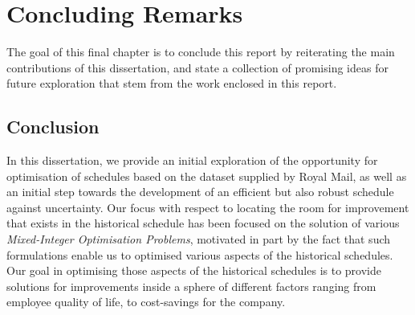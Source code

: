 \chapter{Concluding Remarks}
\label{chapter: Future Directions}

The goal of this final chapter is to conclude this report by reiterating the main contributions of this dissertation, and state a collection of promising ideas for future exploration that stem from the work enclosed in this report.

\section{Conclusion}


In this dissertation, we provide an initial exploration of the opportunity for optimisation of schedules based on the dataset supplied by Royal Mail, as well as an initial step towards the development of an efficient but also robust schedule against uncertainty. Our focus with respect to locating the room for improvement that exists in the historical schedule has been focused on the solution of various \textit{Mixed-Integer Optimisation Problems}, motivated in part by the fact that such formulations enable us to optimised various aspects of the historical schedules. Our goal in optimising those aspects of the historical schedules is to provide solutions for improvements inside a sphere of different factors ranging from employee quality of life, to cost-savings for the company.


